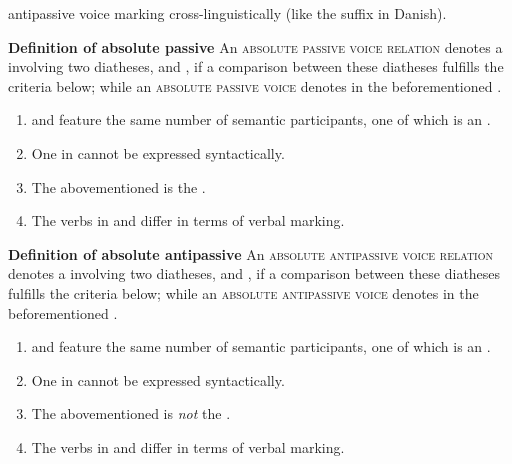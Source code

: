 antipassive voice marking cross-linguistically (like the suffix  in Danish). 

\eanoraggedright
		\textbf{Definition of absolute passive} \newline
		An \textsc{absolute passive voice relation} denotes a  involving two diatheses,  and , if a comparison between these diatheses fulfills the criteria below; while an \textsc{absolute passive voice} denotes  in the beforementioned .
		\begin{enumerate}[label=\roman*)]
			\item {} and  feature the same number of semantic participants, one of which is an .
			\item One  in  cannot be expressed syntactically.
			\item The abovementioned  is the .
			\item The verbs in  and  differ in terms of verbal marking.
		\end{enumerate}
\z

\eanoraggedright
		\textbf{Definition of absolute antipassive} \newline
		An \textsc{absolute antipassive voice relation} denotes a  involving two diatheses,  and , if a comparison between these diatheses fulfills the criteria below; while an \textsc{absolute antipassive voice} denotes  in the beforementioned .
		\begin{enumerate}[label=\roman*)]
			\item {} and  feature the same number of semantic participants, one of which is an .
			\item One  in  cannot be expressed syntactically.
			\item The abovementioned  is \textit{not} the .
			\item The verbs in  and  differ in terms of verbal marking.
		\end{enumerate}
	\z
\smallskip

